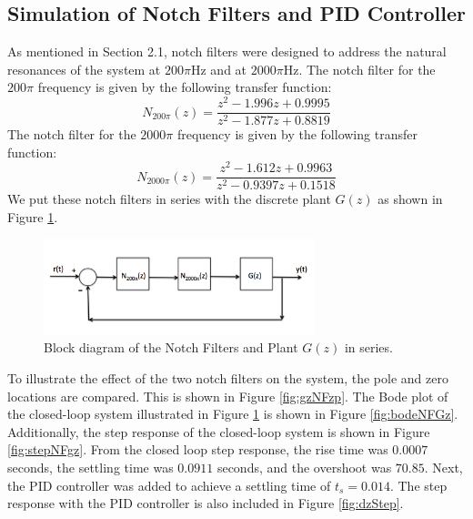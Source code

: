 \documentclass[11pt]{article}
\begin{document}
\subsection{Simulation of Notch Filters and PID Controller}
As mentioned in Section 2.1, notch filters were designed to address the natural resonances of the system at $200\pi$Hz and at $2000\pi$Hz. The notch filter for the $200\pi$ frequency is given by the following transfer function:
\begin{equation}
    N_{200\pi}(z) = \frac{z^{2} - 1.996z + 0.9995}{z^{2} - 1.877z + 0.8819}
\end{equation}
The notch filter for the $2000\pi$ frequency is given by the following transfer function:
\begin{equation}
    N_{2000\pi}(z) = \frac{z^{2} - 1.612z + 0.9963}{z^{2} - 0.9397z + 0.1518}
\end{equation}
We put these notch filters in series with the discrete plant $G(z)$ as shown in Figure \ref{fig:NF_BD}. 
\begin{figure}[H]
    \centering
    \includegraphics[width=0.7\textwidth]{Diagram1.png}
    \caption{Block diagram of the Notch Filters and Plant $G(z)$ in series.}
    \label{fig:NF_BD}
\end{figure}

To illustrate the effect of the two notch filters on the system, the pole and zero locations are compared. This is shown in Figure \ref{fig:gzNFzp}. The Bode plot of the closed-loop system illustrated in Figure \ref{fig:NF_BD} is shown in Figure \ref{fig:bodeNFGz}. Additionally, the step response of the closed-loop system is shown in Figure \ref{fig:stepNFgz}. From the closed loop step response, the rise time was $0.0007$ seconds, the settling time was $0.0911$ seconds, and the overshoot was $70.85$. Next, the PID controller was added to achieve a settling time of $t_{s} = 0.014$. The step response with the PID controller is also included in Figure \ref{fig:dzStep}.\\
\end{document}
